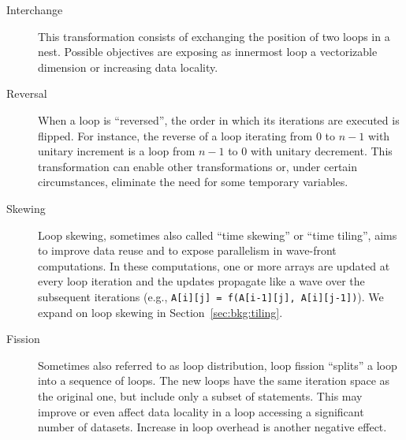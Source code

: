 \begin{description}
\item[Interchange] This transformation consists of exchanging the position of two loops in a nest. Possible objectives are exposing as innermost loop a vectorizable dimension or increasing data locality. 
\item[Reversal] When a loop is ``reversed'', the order in which its iterations are executed is flipped. For instance, the reverse of a loop iterating from $0$ to $n-1$ with unitary increment is a loop from $n-1$ to $0$ with unitary decrement. This transformation can enable other transformations or, under certain circumstances, eliminate the need for some temporary variables.
\item[Skewing] Loop skewing, sometimes also called ``time skewing'' or ``time tiling'', aims to improve data reuse and to expose parallelism in wave-front computations. In these computations, one or more arrays are updated at every loop iteration and the updates propagate like a wave over the subsequent iterations (e.g., \texttt{A[i][j] = f(A[i-1][j], A[i][j-1])}). We expand on loop skewing in Section~\ref{sec:bkg:tiling}.
\item[Fission] Sometimes also referred to as loop distribution, loop fission ``splits'' a loop into a sequence of loops. The new loops have the same iteration space as the original one, but include only a subset of statements. This may improve or even affect data locality in a loop accessing a significant number of datasets. Increase in loop overhead is another negative effect.
\end{description}

